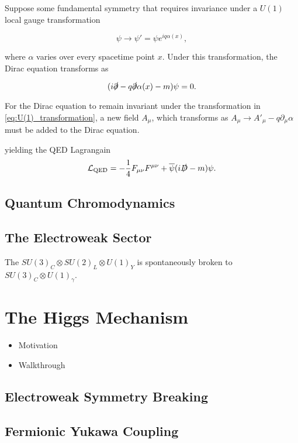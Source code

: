 Suppose some fundamental symmetry that requires invariance under a $U(1)$ local gauge transformation

\begin{equation}\label{eq:U(1)_transformation}
  \psi \rightarrow \psi' = \psi e^{i q \alpha(x)} ,
\end{equation}

where $\alpha$ varies over every spacetime point $x$.
Under this transformation, the Dirac equation transforms as 

\begin{equation}\label{eq:dirac_eq_transformed}
  (i \slashed{\partial} - q\slashed{\partial}\alpha(x) - m )\psi = 0.
\end{equation}


For the Dirac equation to remain invariant under the transformation in \cref{eq:U(1)_transformation}, a new field $A_\mu$, which transforms as $A_\mu \rightarrow A'_\mu - q \partial_\mu \alpha$ must be added to the Dirac equation.

yielding the QED Lagrangain
\begin{equation}\label{eq:qed_lagrangian}
  \mathcal{L}_{\textnormal{QED}} = -\frac{1}{4} F_{\mu\nu} F^{\mu\nu} + \overline{\psi} (i \slashed{D}  - m )\psi.
\end{equation}



\subsection{Quantum Chromodynamics}\label{sec:qcd}

\subsection{The Electroweak Sector}\label{sec:ew_sector}

The $SU(3)_C \otimes SU(2)_L \otimes U(1)_Y$ is spontaneously broken to $SU(3)_C \otimes U(1)_\gamma$.

\section{The Higgs Mechanism}\label{sec:sm_higgs}

\begin{itemize}
  \item Motivation
  \item Walkthrough
\end{itemize}

\subsection{Electroweak Symmetry Breaking}\label{sec:ew_symmetry_breaking}
\subsection{Fermionic Yukawa Coupling}\label{sec:higgs_yukawa_coupling}

